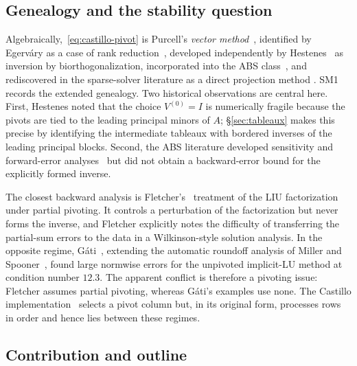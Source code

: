 \documentclass[review,onefignum,onetabnum]{siamart251216}
\begin{document}
\subsection{Genealogy and the stability question}
\label{sec:genealogy}

Algebraically,~\eqref{eq:castillo-pivot} is Purcell's \emph{vector method}~\cite{Purcell1953},
identified by Egerv\'ary as a case of rank reduction~\cite{Egervary1957,Egervary1960},
developed independently by Hestenes~\cite{Hestenes1958} as inversion by
biorthogonalization, incorporated into the ABS class~\cite{AbaffyBS1984,AbaffySpedicato1989},
and rediscovered in the sparse-solver literature as a direct projection method
\cite{BenziMeyer1995,BenziTuma1998}.  SM1 records the extended genealogy.  Two historical
observations are central here.  First, Hestenes noted that the choice $V^{(0)}=I$ is
numerically fragile because the pivots are tied to the leading principal minors of $A$;
\S\ref{sec:tableaux} makes this precise by identifying the intermediate tableaux with
bordered inverses of the leading principal blocks.  Second, the ABS literature developed
sensitivity and forward-error analyses~\cite{Broyden1985,Galantai1991,AsadbeigiPBJ2017}
but did not obtain a backward-error bound for the explicitly formed inverse.

The closest backward analysis is Fletcher's~\cite{Fletcher1997} treatment of the LIU
factorization under partial pivoting.  It controls a perturbation of the factorization but
never forms the inverse, and Fletcher explicitly notes the difficulty of transferring the
partial-sum errors to the data in a Wilkinson-style solution analysis.  In the opposite
regime, G\'ati~\cite{Gati2012,Gati2013}, extending the automatic roundoff analysis of
Miller and Spooner~\cite{MillerSpooner1978a}, found large normwise errors for the
unpivoted implicit-LU method at condition number $12.3$.  The apparent conflict is
therefore a pivoting issue: Fletcher assumes partial pivoting, whereas G\'ati's examples
use none.  The Castillo implementation~\cite[Algorithm~1, Step~3]{CastilloPSM2006}
selects a pivot column but, in its original form, processes rows in order and hence lies
between these regimes.

\subsection{Contribution and outline}
\label{sec:contribution}
\end{document}
